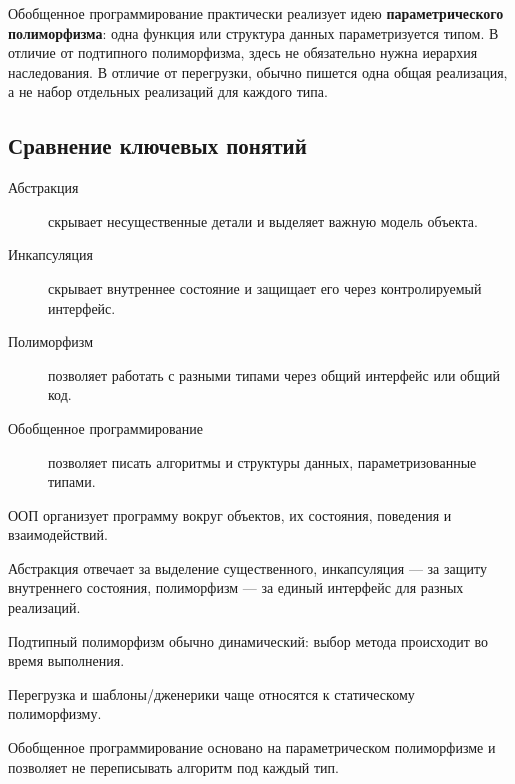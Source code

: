 Обобщенное программирование практически реализует идею \textbf{параметрического полиморфизма}: одна функция или структура данных параметризуется типом. В отличие от подтипного полиморфизма, здесь не обязательно нужна иерархия наследования. В отличие от перегрузки, обычно пишется одна общая реализация, а не набор отдельных реализаций для каждого типа.

\subsection*{Сравнение ключевых понятий}

\begin{description}
    \item[Абстракция] скрывает несущественные детали и выделяет важную модель объекта.
    \item[Инкапсуляция] скрывает внутреннее состояние и защищает его через контролируемый интерфейс.
    \item[Полиморфизм] позволяет работать с разными типами через общий интерфейс или общий код.
    \item[Обобщенное программирование] позволяет писать алгоритмы и структуры данных, параметризованные типами.
\end{description}

\begin{important}
    \item ООП организует программу вокруг объектов, их состояния, поведения и взаимодействий.
    \item Абстракция отвечает за выделение существенного, инкапсуляция --- за защиту внутреннего состояния, полиморфизм --- за единый интерфейс для разных реализаций.
    \item Подтипный полиморфизм обычно динамический: выбор метода происходит во время выполнения.
    \item Перегрузка и шаблоны/дженерики чаще относятся к статическому полиморфизму.
    \item Обобщенное программирование основано на параметрическом полиморфизме и позволяет не переписывать алгоритм под каждый тип.
\end{important}
